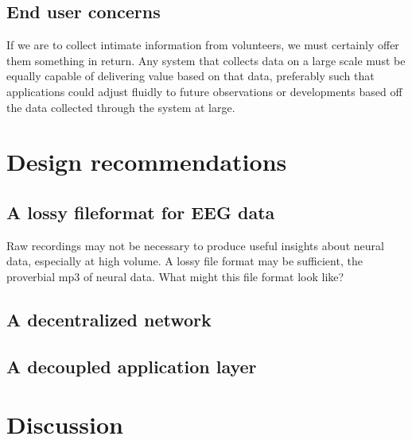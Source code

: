 \documentclass[a4paper,twoside]{article}
\begin{document}
\subsection{End user concerns}

If we are to collect intimate information from volunteers, we must certainly offer them something in return. Any system that collects data on a large scale must be equally capable of delivering value based on that data, preferably such that applications could adjust fluidly to future observations or developments based off the data collected through the system at large. 




\section{Design recommendations}

\subsection{A lossy fileformat for EEG data}
Raw recordings may not be necessary to produce useful insights about neural data, especially at high volume. A lossy file format may be sufficient, the proverbial mp3 of neural data. What might this file format look like?

\subsection{A decentralized network}

\subsection{A decoupled application layer}





\section{Discussion}




% 
% 

\vfill

{\small
}

\vfill
\end{document}
